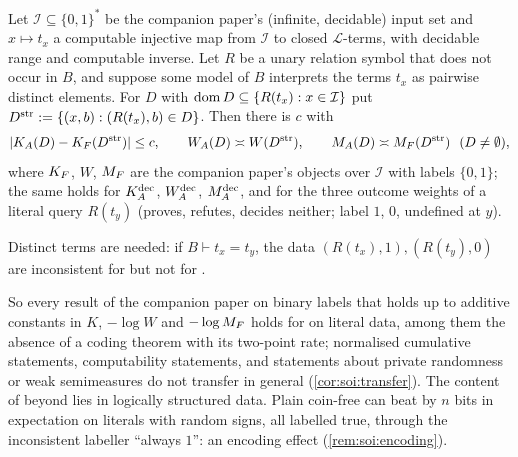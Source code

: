 \begin{theorem}\label{thm:soi:transfer}
Let $\mathcal I\subseteq\{0,1\}^*$ be the companion paper's (infinite, decidable) input set and $x\mapsto t_x$ a computable injective map from $\mathcal I$ to closed $\mathcal L$-terms, with decidable range and computable inverse. Let $R$ be a unary relation symbol that does not occur in $B$, and suppose some model of $B$ interprets the terms $t_x$ as pairwise distinct elements. For $D$ with $\operatorname{dom} D\subseteq\{R(t_x):x\in\mathcal I\}$ put $D^{\rm str}:=\{(x,b):(R(t_x),b)\in D\}$. Then there is $c$ with
\[
\lvert\KA(D)-\KF(D^{\rm str})\rvert\le c,\qquad\WA(D)\asymp W(D^{\rm str}),\qquad\MA(D)\asymp\MF(D^{\rm str})\ \ (D\ne\emptyset),
\]
where $K_{F}$, $W$, $M_{F}$ are the companion paper's objects over $\mathcal I$ with labels $\{0,1\}$; the same holds for $K_{A}^{\mathrm{dec}}$, $W_{A}^{\mathrm{dec}}$, $M_{A}^{\mathrm{dec}}$, and for the three outcome weights of a literal query $R(t_y)$ (proves, refutes, decides neither; label $1$, $0$, undefined at $y$).
\end{theorem}

Distinct terms are needed: if $B\vdash t_x=t_y$, the data $(R(t_x),1),(R(t_y),0)$ are inconsistent for \SAIabbr but not for \SOIabbr.

So every result of the companion paper on binary labels that holds up to additive constants in $K$, $-\log W$ and $-\log M_{F}$ holds for \SAIabbr on literal data, among them the absence of a coding theorem with its two-point rate; normalised cumulative statements, computability statements, and statements about private randomness or weak semimeasures do not transfer in general (\cref{cor:soi:transfer}). The content of \SAIabbr beyond \SOIabbr lies in logically structured data. Plain coin-free \SOIabbr can beat \SAIabbr by $n$ bits in expectation on literals with random signs, all labelled true, through the inconsistent labeller ``always $1$'': an encoding effect (\cref{rem:soi:encoding}).


